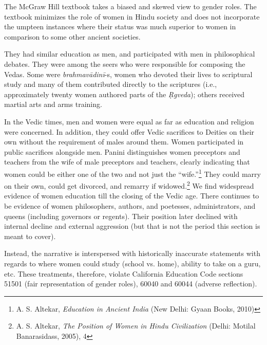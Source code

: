 The McGraw Hill textbook takes a biased and skewed view to gender roles. The textbook minimizes the role of women in Hindu society and does not incorporate the umpteen instances where their status was much superior to women in comparison to some other ancient societies.  

They had similar education as men, and participated with men in philosophical debates. They were among the seers who were responsible for composing the Vedas. Some were \textit{brahmavādinī}-s,  women who devoted their lives to scriptural study and many of them contributed directly to the scriptures (i.e., approximately twenty women authored parts of the \textit{Ṛgveda}); others received martial arts and arms training.

In the Vedic times, men and women were equal as far as education and religion were concerned. In addition, they could offer Vedic sacrifices to Deities on their own without the requirement of males around them. Women participated in public sacrifices alongside men. Panini distinguishes women preceptors and teachers from the wife of male preceptors and teachers, clearly indicating that women could be either one of the two and not just the “wife.”\footnote{A. S. Altekar, \textit{Education in Ancient India} (New Delhi: Gyaan Books, 2010)} They could marry on their own, could get divorced, and remarry if widowed.\footnote{A. S. Altekar, \textit{The Position of Women in Hindu Civilization} (Delhi: Motilal Banarasidass, 2005), 4} We find widespread evidence of women education till the closing of the Vedic age. There continues to be evidence of women philosophers, authors, and poetesses, administrators, and queens (including governors or regents). Their position later declined with internal decline and external aggression (but that is not the period this section is meant to cover).

Instead, the narrative is interspersed with historically inaccurate statements with regards to where women could study (school vs. home), ability to take on a guru, etc. These treatments, therefore, violate California Education Code sections 51501 (fair representation of gender roles), 60040 and 60044 (adverse reflection).  

